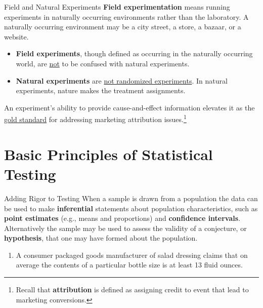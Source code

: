 \documentclass[pdf]{beamer}
\newcommand{\empr}[1]{{\color{franklinblue}\textbf{#1}}}
\theoremstyle{remark}
\theoremstyle{definition}
\begin{document}
\begin{frame}[t]{Field and Natural Experiments}
\empr{Field experimentation} means running experiments in naturally occurring environments rather than the laboratory.  A naturally occurring environment may be a city street, a store, a bazaar, or a website. \\
\vspace{1.5ex}
\small
\begin{itemize}
\item \empr{Field experiments}, though defined as occurring in the naturally occurring world, are \underline{not} to be confused with natural experiments. 
\item \empr{Natural experiments} are \underline{not randomized experiments}. In natural experiments, nature makes the treatment assignments.
\end{itemize}
\normalsize
\vspace{-0.5ex}
An experiment's ability to provide cause-and-effect information elevates it as the \underline{gold standard} for addressing marketing attribution issues.\footnote{Recall that \empr{attribution} is defined as assigning credit to event that lead to marketing conversions.}
\end{frame}


\section{Basic Principles of Statistical Testing}

\begin{frame}[t]{Adding Rigor to Testing}
When a sample is drawn from a population the data can be used to make  \empr{inferential} statements about population characteristics, such as \empr{point estimates} (e.g., means and proportions) and \empr{confidence intervals}. \\ 
\vspace{1.5ex}
Alternatively the sample may be used to assess the validity of a conjecture, or \empr{hypothesis}, that one may have formed about the population. \\
\vspace{1.5ex}
\vspace{1.2ex}
\begin{enumerate}
    \item A consumer packaged goods manufacturer of salad dressing claims that on average the contents of a particular bottle size is at least 13 fluid ounces.  
\end{enumerate}
\end{frame}
\end{document}
